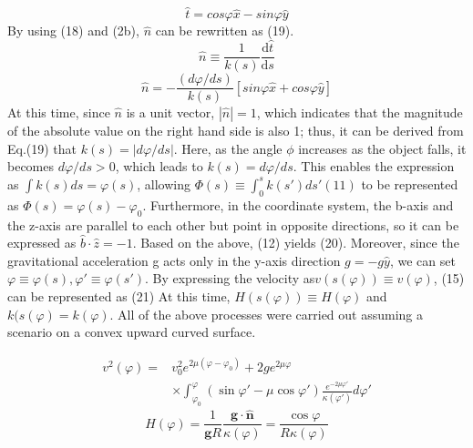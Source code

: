 \documentclass[11pt,letterpaper]{article}
\begin{document}
 \begin{equation}
    \hat{t}= cos\varphi\hat{x}- sin\varphi\hat{y} 
 \tag{18}
 \end{equation}
By using (18) and (2b), $\hat{n}$ can be rewritten as (19).
\begin{equation}
    \hat{n}\equiv \frac{1}{k(s)} \frac{\mathrm{d} \hat{t}}{\mathrm{d} s} 
    \tag{2b}
\end{equation}
\begin{equation}
\hat{n}=-\frac{(d\varphi/ds)}{k(s)} 
[sin\varphi\hat{x}+cos\varphi\hat{y}]
    \tag{19}
\end{equation}
At this time, since $\hat{n}$ is a unit vector, $\left\vert \hat{n} \right\vert = 1$, which indicates that the magnitude of the absolute value on the right hand side is also 1; thus, it can be derived from Eq.(19) that $k(s)=\left\vert d\varphi / ds \right\vert$. Here, as the angle $\phi$ increases as the object falls, it becomes $d\varphi / ds > 0$, which leads to $k(s)=d\varphi / ds$. This enables the expression as $\int k(s)ds=\varphi(s)$, allowing $\Phi(s) \equiv \int_{0}^{s}k(s')ds' (11)$ to be represented as $\Phi(s) = \varphi(s) - \varphi_0$.
Furthermore, in the coordinate system, the b-axis and the z-axis are parallel to each other but point in opposite directions, so it can be expressed as $\hat{b} \cdot \hat{z}=-1$. Based on the above, (12) yields (20). Moreover, since the gravitational acceleration g acts only in the y-axis direction $g=-g\hat{y}$, we can set $\varphi \equiv \varphi(s), \varphi'\equiv\varphi(s')$. By expressing the velocity as$ v(s(\varphi))\equiv v(\varphi)$, (15) can be represented as (21)
At this time, $H(s(\varphi))\equiv H(\varphi)$ and $k(s(\varphi)=k(\varphi)$. All of the above processes were carried out assuming a scenario on a convex upward curved surface.

\begin{equation}
\begin{split}
    v^2(\varphi) = {}& v_0^2 e^{2\mu(\varphi-\varphi_0)}+2g e^{2\mu\varphi}\\& \times \int_{\varphi_0}^{\varphi}(\sin \varphi' - \mu\cos\varphi') \frac{e^{-2\mu\varphi'}}{\kappa(\varphi')}d\varphi'
\end{split}
\tag{20}
\end{equation}
\begin{equation}
    H{(\varphi)}= \frac{1}{\mathbf g R} \frac{\mathbf{g}\cdot\hat{\mathbf{n}}}{\kappa(\varphi)}=\frac{\cos\varphi}{R\kappa(\varphi)}
    \tag{21}
\end{equation}
\end{document}
